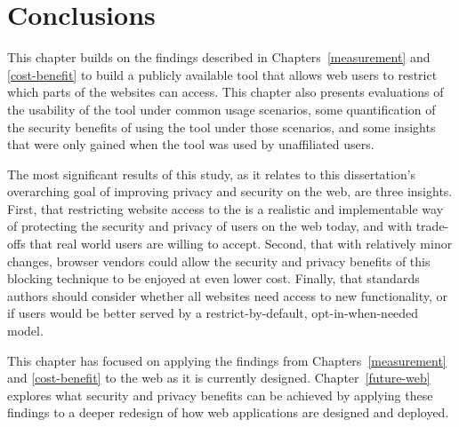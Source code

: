 \section{Conclusions}
\label{current-web:conclusions}

This chapter builds on the findings described in Chapters~\ref{measurement} and
\ref{cost-benefit} to build a publicly available tool that allows web users to
restrict which parts of the \WAPI websites can access.  This chapter also
presents evaluations of the usability of the tool under common usage scenarios,
some quantification of the security benefits of using the tool under those
scenarios, and some insights that were only gained when the tool was
used by unaffiliated users.

The most significant results of this study, as it relates to this
dissertation's overarching goal of improving privacy and security on the web,
are three insights.  First, that restricting website access to the \WAPI is
a realistic and implementable way of protecting the security and privacy of
users on the web today, and with trade-offs that real world users are willing
to accept.  Second, that with relatively minor changes, browser vendors
could allow the security and privacy benefits of this \WAPI blocking technique
to be enjoyed at even lower cost.  Finally, that standards authors should
consider whether all websites need access to new \WAPI functionality, or if
users would be better served by a restrict-by-default, opt-in-when-needed model.

This chapter has focused on applying the findings from
Chapters~\ref{measurement} and \ref{cost-benefit} to the web as it is currently
designed.  Chapter~\ref{future-web} explores what security and privacy
benefits can be achieved by applying these findings to a deeper redesign of
how web applications are designed and deployed.
